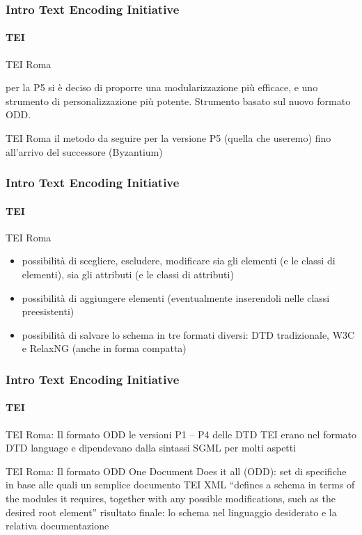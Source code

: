 \begin{frame}
	\frametitle{Intro Text Encoding Initiative}
	\framesubtitle{TEI}
	\addtocounter{nframe}{1}

	\begin{block}{TEI Roma}

		per la P5 si è deciso di proporre una modularizzazione più
		efficace, e uno strumento di personalizzazione più potente.
		Strumento basato sul nuovo formato ODD.


	\end{block}

	\begin{block}{TEI Roma}
		il metodo da seguire per la versione P5 (quella che
		useremo) fino all’arrivo del successore (Byzantium)

	\end{block}

\end{frame}

\begin{frame}
	\frametitle{Intro Text Encoding Initiative}
	\framesubtitle{TEI}
	\addtocounter{nframe}{1}

	\begin{block}{TEI Roma}

		\begin{itemize}
			\item  possibilità di scegliere, escludere, modificare sia gli elementi (e le classi di elementi), sia gli attributi (e le classi di attributi)
			\item possibilità di aggiungere elementi (eventualmente inserendoli nelle classi preesistenti)
			\item possibilità di salvare lo schema in tre formati diversi: DTD  tradizionale, W3C e RelaxNG (anche in forma compatta)
		\end{itemize}

	\end{block}


\end{frame}


\begin{frame}
	\frametitle{Intro Text Encoding Initiative}
	\framesubtitle{TEI}
	\addtocounter{nframe}{1}

	\begin{block}{TEI Roma: Il formato ODD}
		le versioni P1 – P4 delle DTD TEI erano nel formato DTD language e dipendevano dalla sintassi SGML per molti aspetti
	\end{block}

	\begin{block}{TEI Roma: Il formato ODD}
		One Document Does it all (ODD): set di specifiche in base alle quali un semplice documento TEI XML “defines a schema in terms of the modules it requires, together with any possible modifications, such as the desired
		root element” risultato finale: lo schema nel linguaggio desiderato e la relativa documentazione
	\end{block}

\end{frame}


